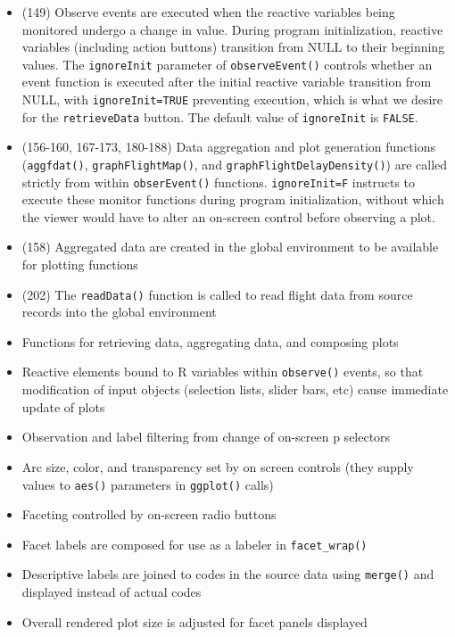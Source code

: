 \documentclass[10pt, letterpaper]{article}
\begin{document}
\begin{spacing}{1.0}
\begin{itemize}
  \item (149) Observe events are executed when the reactive variables being monitored undergo a change in value.  During program initialization, reactive variables (including action buttons) transition from NULL to their beginning values.  The \texttt{ignoreInit} parameter of \texttt{observeEvent()} controls whether an event function is executed after the initial reactive variable transition from NULL, with \texttt{ignoreInit=TRUE} preventing execution, which is what we desire for the \texttt{retrieveData} button.  The default value of \texttt{ignoreInit} is \texttt{FALSE}.
  \item (156-160, 167-173, 180-188) Data aggregation and plot generation functions (\texttt{aggfdat()}, \texttt{graphFlightMap()}, and \texttt{graphFlightDelayDensity()}) are called strictly from within \texttt{obserEvent()} functions.  \texttt{ignoreInit=F} instructs to execute these monitor functions during program initialization, without which the viewer would have to alter an on-screen control before observing a plot.
  \item (158) Aggregated data are created in the global environment to be available for plotting functions
  \item (202) The \texttt{readData()} function is called to read flight data from source records into the global environment
  

  \item Functions for retrieving data, aggregating data, and composing plots
  \item Reactive elements bound to R variables within \texttt{observe()} events, so that modification of input objects (selection lists, slider bars, etc) cause immediate update of plots
  \item Observation and label filtering from change of on-screen p selectors
  \item Arc size, color, and transparency set by on screen controls (they supply values to \texttt{aes()} parameters in \texttt{ggplot()} calls)
  \item Faceting controlled by on-screen radio buttons
  \item Facet labels are composed for use as a labeler in \texttt{facet\_wrap()}
  \item Descriptive labels are joined to codes in the source data using \texttt{merge()} and displayed instead of actual codes
  \item Overall rendered plot size is adjusted for facet panels displayed
\end{itemize}


\end{spacing}
\end{document}
